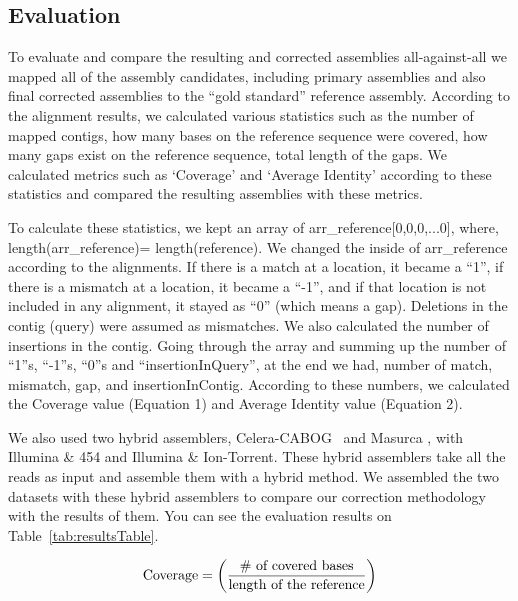 \documentclass{llncs}
\begin{document}
\subsection{Evaluation}

To evaluate and compare the resulting and corrected assemblies all-against-all we mapped all of the assembly candidates, including primary assemblies and also final corrected assemblies to the ``gold standard'' reference assembly. According to the alignment results, we calculated various statistics such as the number of mapped contigs, how many bases on the reference sequence were covered, how many gaps exist on the reference sequence, total length of the gaps. We calculated metrics such as `Coverage' and `Average Identity' according to these statistics and compared the resulting assemblies with these metrics. 

To calculate these statistics, we kept an array of arr{\_}reference[0,0,0,...0], where,
\\length(arr{\_}reference)= length(reference). 
We changed the inside of arr{\_}reference according to the alignments. 
If there is a match at a location, it became a ``1'', if there is a mismatch at a location, it became a ``-1'', and if that location is not included in any alignment, it stayed as ``0'' (which means a gap). Deletions in the contig (query) were assumed as mismatches. 
We also calculated the number of insertions in the contig. 
Going through the array and summing up the number of ``1''s, ``-1''s, ``0''s and ``insertionInQuery'', at the end we had, number of match, mismatch, gap, and insertionInContig. 
According to these numbers, we calculated the Coverage value (Equation 1) and Average Identity value (Equation 2).

We also used two hybrid assemblers, Celera-CABOG~\cite{cabogMiller:2008} and Masurca \cite{masurcaZimin:2013}, with Illumina \& 454 and Illumina \& Ion-Torrent. These hybrid assemblers take all the reads as input and assemble them with a hybrid method. We assembled the two datasets with these hybrid assemblers to compare our correction methodology with the results of them. 
You can see the evaluation results on Table~\ref{tab:resultsTable}. 


\begin{equation}
\textnormal{Coverage} = \left(\frac{\textnormal{\#{ }of{ }covered{ }bases}}{\textnormal{length of the reference}}\right)
\end{equation}
\end{document}
